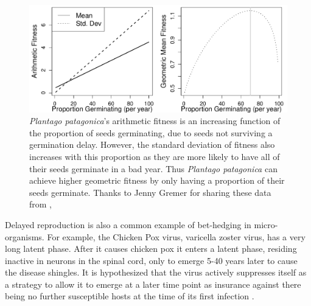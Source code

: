   \begin{figure}
\begin{center}
\includegraphics[width= \textwidth]{Journal_figs/single_locus_selection/Gremer_hedging_example/Gremer_hedging_example.pdf}
\end{center}
\caption{  {\it Plantago patagonica}'s arithmetic fitness is an
  increasing function of the proportion of seeds germinating, due to
  seeds not surviving a germination delay. However, the standard
  deviation of fitness also increases with this proportion as they are
  more likely to have all of their seeds germinate in a bad year. Thus
  {\it Plantago patagonica}  can achieve higher geometric fitness by
  only having a proportion of their seeds germinate. Thanks to Jenny
  Gremer for sharing these data from \citet{gremer2014bet},  } \label{fig:desert_bet_hedging}
\end{figure}



Delayed reproduction is also a common example of bet-hedging in
micro-organisms. For example, the Chicken Pox virus, varicella zoster
virus, has a very long latent phase. After it causes chicken pox it enters a latent phase, residing inactive in neurons in
the spinal cord, only to emerge 5-40 years later to cause the disease
shingles. It is hypothesized that the virus actively suppresses itself
as a strategy to allow it to emerge at a later time point as insurance
against there being no further susceptible hosts at the time of its
first infection \citep{stumpf2002herpes}. 


